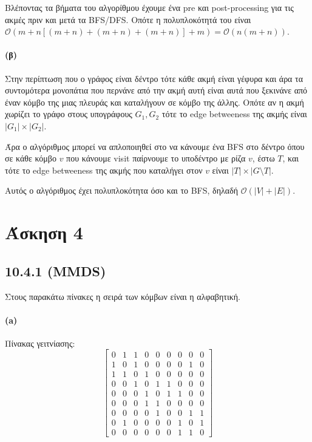 \documentclass[a4paper,11pt]{article}
\begin{document}
Βλέποντας τα βήματα του αλγορίθμου έχουμε ένα pre και post-processing για τις ακμές πριν και μετά τα BFS/DFS.
Οπότε η πολυπλοκότητά του είναι $\mathcal{O}(m + n[(m+n) + (m+n) + (m+n)] + m) = \mathcal{O}(n(m+n))$.

\paragraph{(β)} Στην περίπτωση που ο γράφος είναι δέντρο τότε κάθε ακμή είναι γέφυρα και άρα τα συντομότερα μονοπάτια που περνάνε από την ακμή αυτή είναι αυτά που ξεκινάνε από έναν κόμβο της μιας πλευράς και καταλήγουν σε κόμβο της άλλης.
Οπότε αν η ακμή χωρίζει το γράφο στους υπογράφους $G_1,G_2$ τότε το edge betweeness της ακμής είναι $|G_1| \times |G_2|$.

Άρα ο αλγόριθμος μπορεί να απλοποιηθεί στο να κάνουμε ένα BFS στο δέντρο όπου σε κάθε κόμβο $v$ που κάνουμε visit παίρνουμε το υποδέντρο με ρίζα $v$, έστω $T$, και τότε το edge betweeness της ακμής που καταλήγει στον $v$ είναι $|T| \times |G \setminus T|$.

Αυτός ο αλγόριθμος έχει πολυπλοκότητα όσο και το BFS, δηλαδή $\mathcal{O}(|V|+|E|)$.


\section*{Άσκηση 4}

\subsection*{10.4.1 (MMDS)}

Στους παρακάτω πίνακες η σειρά των κόμβων είναι η αλφαβητική.

\paragraph{(a)} Πίνακας γειτνίασης:
\[
	\begin{bmatrix}
		0 & 1 & 1 & 0 & 0 & 0 & 0 & 0 & 0 \\
		1 & 0 & 1 & 0 & 0 & 0 & 0 & 1 & 0 \\
		1 & 1 & 0 & 1 & 0 & 0 & 0 & 0 & 0 \\
		0 & 0 & 1 & 0 & 1 & 1 & 0 & 0 & 0 \\
		0 & 0 & 0 & 1 & 0 & 1 & 1 & 0 & 0 \\
		0 & 0 & 0 & 1 & 1 & 0 & 0 & 0 & 0 \\
		0 & 0 & 0 & 0 & 1 & 0 & 0 & 1 & 1 \\
		0 & 1 & 0 & 0 & 0 & 0 & 1 & 0 & 1 \\
		0 & 0 & 0 & 0 & 0 & 0 & 1 & 1 & 0
	\end{bmatrix}
\]
\end{document}
